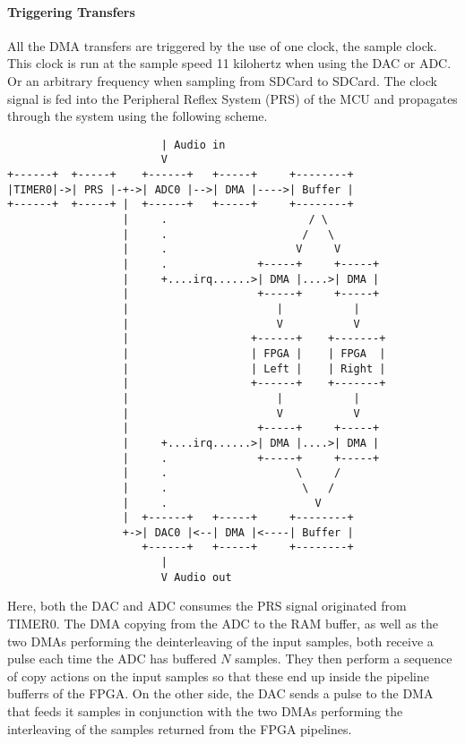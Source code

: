 \paragraph{Triggering Transfers}

All the DMA transfers are triggered by the use of one clock, the sample clock.
This clock is run at the sample speed 11 kilohertz when using the DAC or ADC. Or
an arbitrary frequency when sampling from SDCard to SDCard. The clock signal is fed into
the Peripheral Reflex System  (PRS) of the MCU and propagates
through the system using the following scheme.

\begin{verbatim}
                        | Audio in
                        V
+------+  +-----+    +------+   +-----+     +--------+
|TIMER0|->| PRS |-+->| ADC0 |-->| DMA |---->| Buffer |
+------+  +-----+ |  +------+   +-----+     +--------+
                  |     .                      / \
                  |     .                     /   \
                  |     .                    V     V
                  |     .              +-----+     +-----+
                  |     +....irq......>| DMA |....>| DMA |
                  |                    +-----+     +-----+
                  |                       |           |
                  |                       V           V
                  |                   +------+    +-------+
                  |                   | FPGA |    | FPGA  |
                  |                   | Left |    | Right |
                  |                   +------+    +-------+
                  |                       |           |
                  |                       V           V
                  |                    +-----+     +-----+
                  |     +....irq......>| DMA |....>| DMA |
                  |     .              +-----+     +-----+
                  |     .                    \     /
                  |     .                     \   /
                  |     .                       V
                  |  +------+   +-----+     +--------+
                  +->| DAC0 |<--| DMA |<----| Buffer |
                     +------+   +-----+     +--------+
                        |
                        V Audio out
\end{verbatim}

Here, both the DAC and ADC consumes the PRS signal originated from TIMER0. The
DMA copying from the ADC to the RAM buffer, as well as the two DMAs performing the
deinterleaving of the input samples, both receive a pulse each time the ADC has
buffered $N$ samples. They then perform a sequence of copy actions on the input
samples so that these end up inside the pipeline bufferrs of the FPGA. On the
other side, the DAC sends a pulse to the DMA that feeds it samples in conjunction
with the two DMAs performing the interleaving of the samples returned from the
FPGA pipelines.
